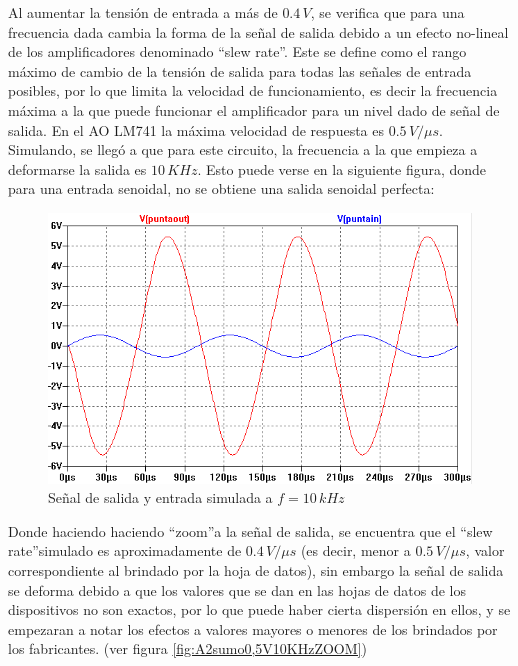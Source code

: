 \documentclass[10pt,spanish,a4paper,openany,notitlepage]{article}
\begin{document}
Al aumentar la tensión de entrada a más de $0.4\,\unit{V}$, se verifica que para una
frecuencia dada cambia la forma de la señal de salida debido a un efecto no-lineal de los
amplificadores denominado \textquotedblleft slew rate\textquotedblright. Este se define como
el rango máximo de cambio de la
tensión de salida para todas las señales de entrada posibles, por lo que limita la
velocidad de funcionamiento, es decir la frecuencia máxima a la que puede funcionar el
amplificador para un nivel dado de señal de salida. En el AO LM741 la máxima velocidad de
respuesta es $0.5\,\unit{V/\mu s}$. Simulando, se llegó a que para este circuito, la
frecuencia a la que empieza a deformarse la salida es $10\,\unit{KHz}$. Esto puede verse en
la siguiente figura, donde para una entrada senoidal, no se obtiene una salida senoidal perfecta:

\begin{figure}[H]
\centering
\includegraphics[scale=0.8]{simulaciones/A2sumo0,5V10KHz.png}
\caption{Señal de salida y entrada simulada a $f = 10\,\unit{kHz}$}
\label{fig:A2sumo0,5V10KHz}
\end{figure}

Donde haciendo haciendo \textquotedblleft zoom\textquotedblright a la señal de salida, se
encuentra que el \textquotedblleft slew rate\textquotedblright simulado es aproximadamente de $0.4\,\unit{V/\mu s}$ (es decir, menor a
$0.5\,\unit{V/\mu s}$, valor correspondiente al brindado por la hoja de datos), sin embargo la señal de salida se deforma debido a que los valores que se dan en las hojas de datos de los dispositivos no son exactos, por lo que puede haber cierta dispersión en ellos, y se empezaran a notar los efectos a valores mayores o menores de los brindados por los fabricantes. (ver figura \ref{fig:A2sumo0,5V10KHzZOOM})
\end{document}
